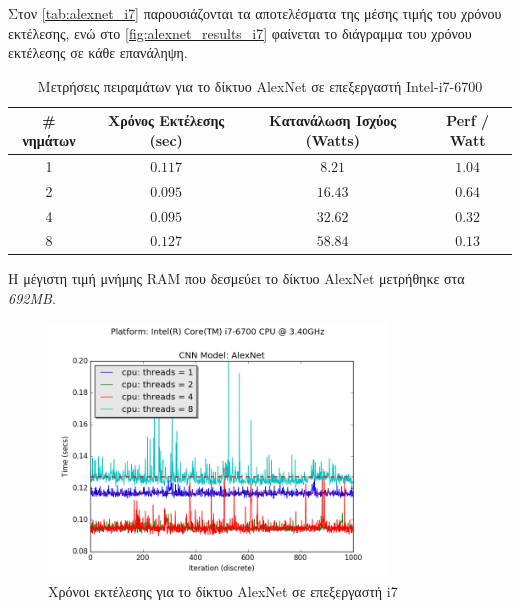 Στον \autoref{tab:alexnet_i7} παρουσιάζονται τα αποτελέσματα της μέσης τιμής
του χρόνου εκτέλεσης, ενώ στο \autoref{fig:alexnet_results_i7} φαίνεται
το διάγραμμα του χρόνου εκτέλεσης σε κάθε επανάληψη.

\begin{table}[H]
  \begin{center}
    \caption{Μετρήσεις πειραμάτων για το δίκτυο AlexNet σε επεξεργαστή Intel-i7-6700}
    \label{tab:alexnet_i7}
    \begin{tabular}{ | c | c | c | c | }
      \hline
      \rowcolor{Gray}
      \# νημάτων & Χρόνος Εκτέλεσης (sec) & Κατανάλωση Ισχύος (Watts) & Perf / Watt \\
      \hline
      1 & $0.117$ & $8.21$ & $1.04$ \\
      2 & $0.095$ & $16.43$ & $0.64$ \\
      4 & $0.095$ & $32.62$ & $0.32$ \\
      8 & $0.127$ & $58.84$ & $0.13$ \\
      \hline
    \end{tabular}
  \end{center}
\end{table}

Η μέγιστη τιμή μνήμης RAM που δεσμεύει το δίκτυο AlexNet μετρήθηκε στα \emph{692MB}.

\begin{figure}[H]
  \centering
  \includegraphics[width=0.8\textwidth]{./images/chapter6/benchmark_alexnet_i7.png}
  \caption[Χρόνoι εκτέλεσης για το δίκτυο AlexNet σε επεξεργαστή i7]{Χρόνοι εκτέλεσης για το δίκτυο AlexNet σε επεξεργαστή i7}
  \label{fig:alexnet_results_i7}
\end{figure}



